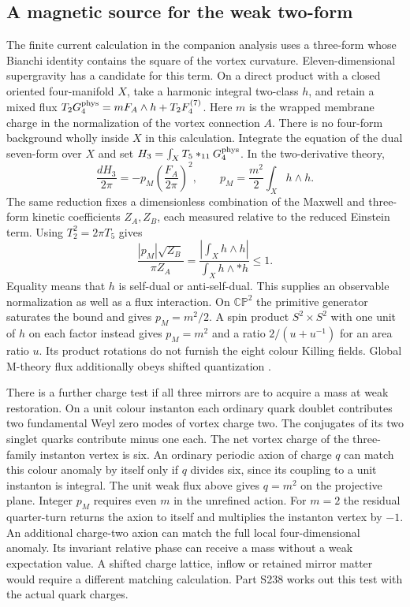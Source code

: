 \documentclass[aps,prd,reprint,onecolumn,nofootinbib,amsmath,amssymb]{revtex4-2}
\begin{document}
\subsection{A magnetic source for the weak two-form}
The finite current calculation in the companion analysis uses a three-form whose Bianchi identity contains the square of the vortex curvature. Eleven-dimensional supergravity has a candidate for this term. On a direct product with a closed oriented four-manifold $X$, take a harmonic integral two-class $h$, and retain a mixed flux $T_2G_4^{\rm phys}=m F_A\wedge h+T_2 F_4^{(7)}$. Here $m$ is the wrapped membrane charge in the normalization of the vortex connection $A$. There is no four-form background wholly inside $X$ in this calculation. Integrate the equation of the dual seven-form over $X$ and set $H_3=\int_X T_5*_{11}G_4^{\rm phys}$. In the two-derivative theory,
\begin{equation}
 \frac{dH_3}{2\pi}=-p_M\left(\frac{F_A}{2\pi}\right)^2,
 \qquad p_M=\frac{m^2}{2}\int_X h\wedge h .
\end{equation}
The same reduction fixes a dimensionless combination of the Maxwell and three-form kinetic coefficients $Z_A,Z_B$, each measured relative to the reduced Einstein term. Using $T_2^2=2\pi T_5$ gives
\begin{equation}
 \frac{|p_M|\sqrt{Z_B}}{\pi Z_A}=
 \frac{|\int_X h\wedge h|}{\int_X h\wedge *h}\leq1 .
 \label{eq:magneticweak}
\end{equation}
Equality means that $h$ is self-dual or anti-self-dual. This supplies an observable normalization as well as a flux interaction. On $\mathbb{CP}^2$ the primitive generator saturates the bound and gives $p_M=m^2/2$. A spin product $S^2\times S^2$ with one unit of $h$ on each factor instead gives $p_M=m^2$ and a ratio $2/(u+u^{-1})$ for an area ratio $u$. Its product rotations do not furnish the eight colour Killing fields. Global M-theory flux additionally obeys shifted quantization \cite{Witten1997Flux}.

There is a further charge test if all three mirrors are to acquire a mass at weak restoration. On a unit colour instanton each ordinary quark doublet contributes two fundamental Weyl zero modes of vortex charge two. The conjugates of its two singlet quarks contribute minus one each. The net vortex charge of the three-family instanton vertex is six. An ordinary periodic axion of charge $q$ can match this colour anomaly by itself only if $q$ divides six, since its coupling to a unit instanton is integral. The unit weak flux above gives $q=m^2$ on the projective plane. Integer $p_M$ requires even $m$ in the unrefined action. For $m=2$ the residual quarter-turn returns the axion to itself and multiplies the instanton vertex by $-1$. An additional charge-two axion can match the full local four-dimensional anomaly. Its invariant relative phase can receive a mass without a weak expectation value. A shifted charge lattice, inflow or retained mirror matter would require a different matching calculation. Part S238 works out this test with the actual quark charges.
\end{document}
